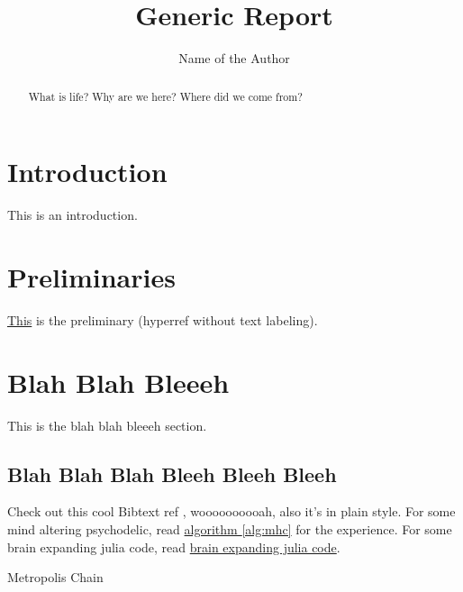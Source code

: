 \documentclass[]{article}
\title{Generic Report}
\author{Name of the Author}
\begin{document}
\maketitle

\begin{abstract}
    What is life? Why are we here? Where did we come from?
\end{abstract}


\section{Introduction}
    This is an introduction. 

\section{Preliminaries}\label{sec:preliminaries}
    \hyperref[sec:preliminaries]{This} is the preliminary (hyperref without text labeling). 
    
\section{Blah Blah Bleeeh}
    This is the blah blah bleeeh section. 
    \subsection{Blah Blah Blah Bleeh Bleeh Bleeh}
    Check out this cool Bibtext ref \cite[this]{texbook}, woooooooooah, also it's in plain style. For some mind altering psychodelic, read \hyperref[alg:mhc]{algorithm \ref*{alg:mhc}} for the experience. For some brain expanding julia code, read \hyperref[code:brain_expand]{brain expanding julia code}. 
    \begin{algorithm}[H]
        \begin{algorithmic}[t]
        \end{algorithmic}
        \caption{Metropolis Chain}
        \label{alg:mhc}
    \end{algorithm}
    \label{code:brain_expand}
    
    
\end{document}
